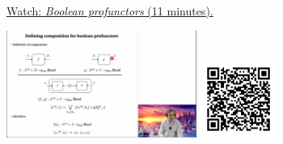 
\begin{minipage}{10cm}
    \href{https://act4e-spring21.netlify.app/videos/spring2021-design:design:bool-prof.html}{Watch: \emph{Boolean profunctors} (11 minutes).}
        
    \href{https://act4e-spring21.netlify.app/videos/spring2021-design:design:bool-prof.html}{\includegraphics[height=3.5cm]{spring2021-design:design:bool-prof/thumbnails.jpg}}
    \href{https://act4e-spring21.netlify.app/videos/spring2021-design:design:bool-prof.html}{\includegraphics[height=2.5cm]{spring2021-design:design:bool-prof/qrcode.png}}
\end{minipage}
